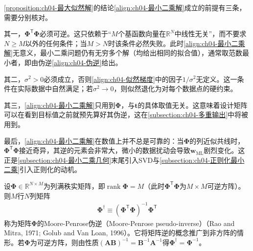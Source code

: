 \documentclass[../../main.tex]{subfiles}
\begin{document}
\begin{remark}
\cref{proposition:ch04-最大似然解}的结论\eqref{align:ch04-最小二乘解}成立的前提有三条，需要分别核对。

其一，$\boldsymbol{\Phi}^{\mathsf{T}}\boldsymbol{\Phi}$必须可逆。这只依赖于“$M$个基函数向量在$\mathbb{R}^N$中线性无关”，而不要求$N\geqslant M$以外的任何条件；当$M>N$时该条件必然失败。此时\eqref{align:ch04-最小二乘解}无意义，最小二乘问题仍有无穷多个解（均给出相同的拟合值），通常取范数最小者，即由伪逆\eqref{align:ch04-伪逆}给出。

其二，$\sigma^2>0$必须成立，否则\eqref{align:ch04-似然梯度}中的因子$1/\sigma^2$无定义。这一条件在实际数据中自然满足；若$\sigma^2\to0$，则似然退化为对每个数据点的硬约束。

其三，\eqref{align:ch04-最小二乘解}只用到$\boldsymbol{\Phi}$，与$\boldsymbol{t}$的具体取值无关。这意味着设计矩阵可以在看到目标值之前就预先算好其伪逆，这在\cref{subsection:ch04-多重输出}中将被用到。

最后，\eqref{align:ch04-最小二乘解}在数值上并不总是可靠的：当$\boldsymbol{\Phi}$的列近似共线时，$\boldsymbol{\Phi}^{\mathsf{T}}\boldsymbol{\Phi}$接近奇异，其逆的元素会非常大，微小的数据扰动会导致$\boldsymbol{w}_{\mathrm{ML}}$剧烈变化。这正是\cref{subsection:ch04-最小二乘几何}末尾引入SVD与\cref{subsection:ch04-正则化最小二乘}引入正则化的动机。
\end{remark}

\begin{definition}\label{definition:ch04-伪逆}
设$\boldsymbol{\Phi}\in\mathbb{R}^{N\times M}$为列满秩实矩阵，即$\operatorname{rank}\boldsymbol{\Phi}=M$（此时$\boldsymbol{\Phi}^{\mathsf{T}}\boldsymbol{\Phi}$为$M\times M$可逆方阵）。则$M$行$N$列矩阵
\begin{align}
  \boldsymbol{\Phi}^{\dagger}\equiv(\boldsymbol{\Phi}^{\mathsf{T}}\boldsymbol{\Phi})^{-1}\boldsymbol{\Phi}^{\mathsf{T}}
  \label{align:ch04-伪逆}
\end{align}
称为矩阵$\boldsymbol{\Phi}$的Moore-Penrose伪逆（Moore-Penrose pseudo-inverse）（Rao and Mitra, 1971; Golub and Van Loan, 1996）。它将矩阵逆的概念推广到非方阵的情形。若$\boldsymbol{\Phi}$为可逆方阵，则由性质$(\boldsymbol{A}\boldsymbol{B})^{-1}=\boldsymbol{B}^{-1}\boldsymbol{A}^{-1}$得$\boldsymbol{\Phi}^{\dagger}=\boldsymbol{\Phi}^{-1}$。
\end{definition}
\end{document}
